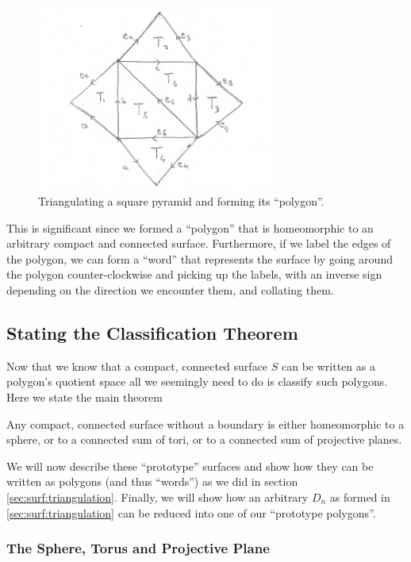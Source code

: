 \begin{figure}[htbp]
  \centering
  \includegraphics[width=8cm]{pyramid.png}
  \caption{Triangulating a square pyramid and forming its ``polygon''.}
  \label{fig:square-pyramid}
\end{figure}

This is significant since we formed a ``polygon'' that is homeomorphic
to an arbitrary compact and connected surface. Furthermore, if we
label the edges of the polygon, we can form a ``word'' that represents
the surface by going around the polygon counter-clockwise and picking
up the labels, with an inverse sign depending on the direction we
encounter them, and collating them. 

\subsection{Stating the Classification Theorem}
\label{sec:surf:thm}

Now that we know that a compact, connected surface $S$ can be written
as a polygon's quotient space all we seemingly need to do is classify
such polygons. Here we state the main theorem

\begin{thm}
  \label{thm:main}
  Any compact, connected surface without a boundary is either
  homeomorphic to a sphere, or to a connected sum of tori, or to a
  connected sum of projective planes. 
\end{thm}

We will now describe these ``prototype'' surfaces and show how they
can be written as polygons (and thus ``words'') as we did in section
\ref{sec:surf:triangulation}. Finally, we will show how an arbitrary
$D_n$ as formed in \ref{sec:surf:triangulation} can be reduced into
one of our ``prototype polygons''.


\subsubsection{The Sphere, Torus and Projective Plane}
\label{sec:surf:thm:stp}

